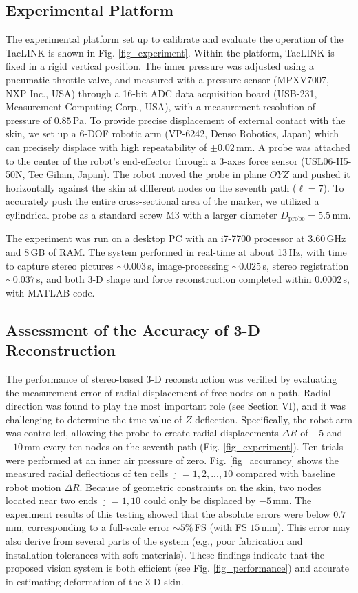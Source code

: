 \documentclass[10pt,letterpaper,journal,final,twoside,twocolumn,nofonttune]{IEEEtran}
\begin{document}
\subsection{Experimental Platform}
The experimental platform set up to calibrate and evaluate the operation of the TacLINK is shown in Fig. \ref{fig_experiment}. Within the platform, TacLINK is fixed in a rigid vertical position. The inner pressure was adjusted using a pneumatic throttle valve, and measured with a pressure sensor (MPXV7007, NXP Inc., USA) through a 16-bit ADC data acquisition board (USB-231, Measurement Computing Corp., USA), with a measurement resolution of pressure of $0.85$\,Pa. To provide precise displacement of external contact with the skin, we set up a 6-DOF robotic arm (VP-6242, Denso Robotics, Japan) which can precisely displace with high repeatability of $\pm0.02\,\text{mm}$. A probe was attached to the center of the robot's end-effector through a 3-axes force sensor (USL06-H5-50N, Tec Gihan, Japan). 
The robot moved the probe in plane $OYZ$ and pushed it horizontally against the skin at different nodes on the seventh path ($\ell=7$). To accurately push the entire cross-sectional area of the marker, we utilized a cylindrical probe as a standard screw M3 with a larger diameter $D_{\text{probe}}=5.5$\,mm. 

The experiment was run on a desktop PC with an i7-7700 processor at 3.60\,GHz and 8\,GB of RAM. The system performed in real-time at about 13\,Hz, with time to capture stereo pictures $\sim{0.003}$\,s, image-processing $\sim{0.025}$\,s, stereo registration $\sim{0.037}$\,s, and both 3-D shape and force reconstruction completed within $0.0002$\,s, with MATLAB code.
\subsection{Assessment of the Accuracy of 3-D Reconstruction} 
The performance of stereo-based 3-D reconstruction was verified by evaluating the measurement error of radial displacement of free nodes on a path. Radial direction was found to play the most important role (see Section VI), and it was challenging to determine the true value of $Z$-deflection. Specifically, the robot arm was controlled, allowing the probe to create radial displacements $\Delta{R}$ of $-5$ and $-10$\,mm every ten nodes on the seventh path (Fig. \ref{fig_experiment}). Ten trials were performed at an inner air pressure of zero. Fig. \ref{fig_accurancy} shows the measured radial deflections of ten cells $\jmath=1,2,...,10$ compared with baseline robot motion $\Delta{R}$. Because of geometric constraints on the skin, two nodes located near two ends $\jmath=1,10$ could only be displaced by $-5$\,mm. The experiment results of this testing showed that the absolute errors were below $0.7$\,mm, corresponding to a full-scale error $\sim{5}\%\,$FS (with FS $15$\,mm). This error may also derive from several parts of the system (e.g., poor fabrication and installation tolerances with soft materials). These findings indicate that the proposed vision system is both efficient (see Fig. \ref{fig_performance}) and accurate in estimating deformation of the 3-D skin. 
\end{document}
